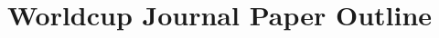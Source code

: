 \documentclass[a4paper]{article}
\author{}
\date{}
\begin{document}
\title{Worldcup Journal Paper Outline}
\maketitle


%
%
%
%
%
%
%
%
%
\end{document}
